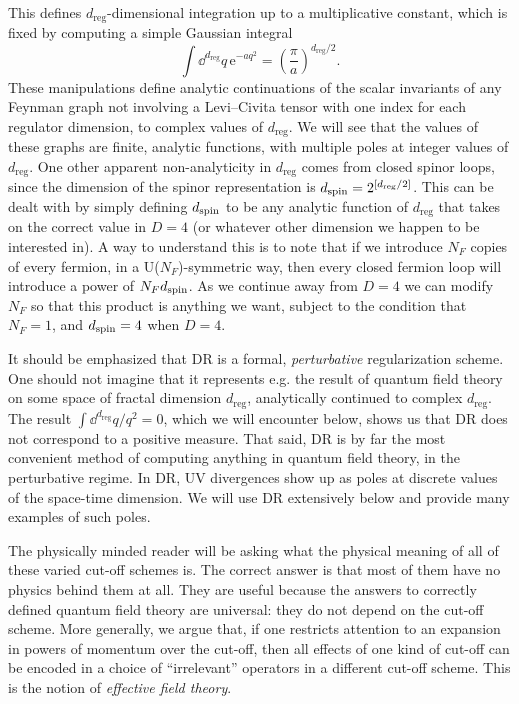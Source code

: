 This defines $d_{\mathrm{reg}}$-dimensional integration up to a multiplicative constant,
which is fixed by computing a simple Gaussian integral
\[
  \int\!\dd^{d_{\mathrm{reg}}}q\,\mathrm{e}^{-aq^2}
  =\left(\frac{\pi}{a}\right)^{d_{\mathrm{reg}}/2} .
\]
These manipulations define analytic continuations of the scalar invariants of
any Feynman graph not involving a Levi--Civita tensor with one index for each
regulator dimension, to complex
values of $d_{\mathrm{reg}}$. We will see that the values of these graphs are finite,
analytic functions, with multiple poles at integer values of $d_{\mathrm{reg}}$. One other
apparent non-analyticity in $d_{\mathrm{reg}}$ comes from closed spinor loops, since the
dimension of the spinor representation is $d_{\rm spin}=2^{[d_{\mathrm{reg}}/2]}$. This can
be dealt with by simply defining $d_{\rm spin}$ to be any analytic function of
$d_{\mathrm{reg}}$ that takes on the correct value in $D=4$ (or whatever other dimension we
happen to be interested in). A way to understand this is to note that if we
introduce $N_F$ copies of every fermion, in a U($N_F$)-symmetric way, then
every closed fermion loop will introduce a power of $N_Fd_{\rm spin}$. As we
continue away from $D=4$ we can modify $N_F$ so that this product is anything
we want, subject to the condition that $N_F=1$, and $d_{\rm spin}=4$ when
$D=4$.

It should be emphasized that DR is a formal, \emph{perturbative}
regularization scheme. One should not imagine that it represents e.g. the
result of quantum field theory on some space of fractal dimension $d_{\mathrm{reg}}$,
analytically continued to complex $d_{\mathrm{reg}}$. The result
$\int\dd^{d_{\mathrm{reg}}}q/q^2=0$, which we will encounter below, shows us that DR does not
correspond to a positive measure. That said, DR is by far the most convenient
method of computing anything in quantum field theory, in the perturbative
regime. In DR, UV divergences show up as poles at discrete values of the
space-time dimension. We will use DR extensively below and provide many
examples of such poles.

The physically minded reader will be asking what the physical meaning of all
of these varied cut-off schemes is. The correct answer is that most of them
have no physics behind them at all. They are useful because the answers to
correctly defined quantum field theory are universal: they do not depend on
the cut-off scheme. More generally, we argue that, if one restricts attention
to an expansion in powers of momentum over the cut-off, then all effects of one
kind of cut-off can be encoded in a choice of ``irrelevant'' operators in a
different cut-off scheme. This is the notion of \emph{effective field theory}.

